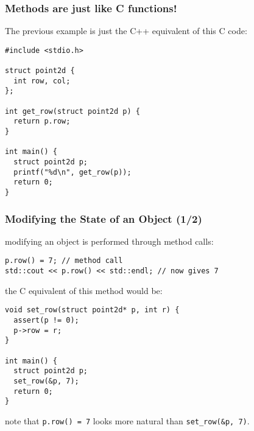 \documentclass{beamer}
\newcommand{\cpp}{{C++}\xspace}
\newcommand{\code}[1]{{\scriptsize{\texttt{#1}}}\xspace}
\begin{document}
\begin{frame}[fragile]
  \frametitle{Methods are just like C functions!}

The previous example is just the \cpp equivalent of this C code:

\begin{lstlisting}
#include <stdio.h>

struct point2d {
  int row, col;
};

int get_row(struct point2d p) {
  return p.row;
}

int main() {
  struct point2d p;
  printf("%d\n", get_row(p));
  return 0;
}
\end{lstlisting}

\end{frame}



\begin{frame}[fragile]
  \frametitle{Modifying the State of an Object (1/2)}

modifying an object is performed through method calls:

\begin{lstlisting}
p.row() = 7; // method call
std::cout << p.row() << std::endl; // now gives 7
\end{lstlisting} %

\smallskip

the C equivalent of this method would be:
\begin{lstlisting}
void set_row(struct point2d* p, int r) {
  assert(p != 0);
  p->row = r;
}

int main() {
  struct point2d p;
  set_row(&p, 7);
  return 0;
}
\end{lstlisting}

note that \code{p.row() = 7} looks more natural than \code{set\_row(\&p, 7)}.

\end{frame}
\end{document}
